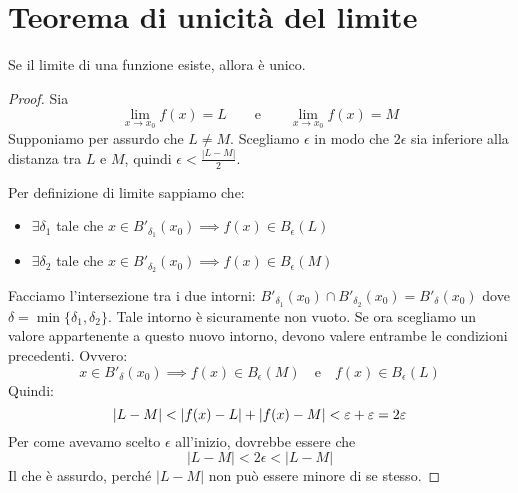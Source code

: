 \section{Teorema di unicità del limite}
\begin{theorem}
Se il limite di una funzione esiste, allora è unico.
\end{theorem}
\begin{proof}
Sia
\begin{equation*}
\lim_{x \to x_0} f(x) = L \qquad \text{e} \qquad \lim_{x \to x_0} f(x) = M
\end{equation*}
Supponiamo per assurdo che $L \neq M$. Scegliamo $\epsilon$ in modo che $2\epsilon$ sia inferiore alla distanza tra $L$ e $M$, quindi $\epsilon < \frac{|L-M|}{2}$.

Per definizione di limite sappiamo che:
\begin{itemize}
\item $\exists \delta_1$ tale che $x \in B'_{\delta_1} (x_0) \implies f(x) \in B_\epsilon (L)$
\item $\exists \delta_2$ tale che $x \in B'_{\delta_2} (x_0) \implies f(x) \in B_\epsilon (M)$
\end{itemize}

Facciamo l'intersezione tra i due intorni: $B'_{\delta_1} (x_0) \cap B'_{\delta_2} (x_0) = B'_\delta (x_0)$ dove $\delta = \min \{\delta_1, \delta_2\}$. Tale intorno è sicuramente non vuoto. Se ora scegliamo un valore appartenente a questo nuovo intorno, devono valere entrambe le condizioni precedenti. Ovvero:
\begin{equation*}
x \in B'_\delta (x_0) \implies f(x) \in B_\epsilon (M) \quad \text{e} \quad  f(x) \in B_\epsilon (L)
\end{equation*}
Quindi:
\begin{equation*}
|L - M| < |f(x) - L| + |f(x) - M| < \epsilon + \epsilon = 2\epsilon \\
\end{equation*}
Per come avevamo scelto $\epsilon$ all'inizio, dovrebbe essere che
\begin{equation*}
|L - M| < 2\epsilon < |L - M|
\end{equation*}
Il che è assurdo, perché $|L-M|$ non può essere minore di se stesso.
\end{proof}